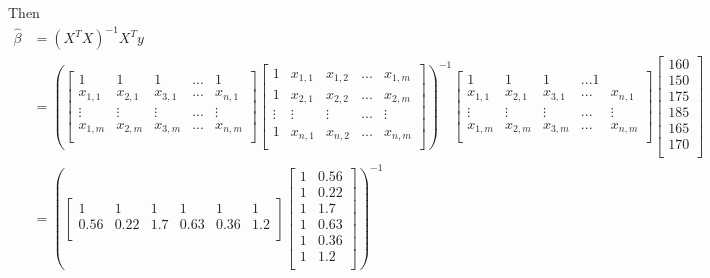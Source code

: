 \begin{enumerate}
Then \begin{align*}
\hat{\beta} &= (X^TX)^{-1}X^Ty \\ &= \left(
\begin{bmatrix}
1 & 1 & 1 & ... & 1  \\
x_{1,1} & x_{2,1} & x_{3,1} & ... & x_{n,1} \\
\vdots & \vdots & \vdots & ... & \vdots \\
x_{1,m} & x_{2,m} & x_{3,m} & ... & x_{n,m} \\
\end{bmatrix}
\begin{bmatrix}
1 & x_{1,1} & x_{1,2} & ... & x_{1,m} \\
1 & x_{2,1} & x_{2,2} & ... & x_{2,m} \\
\vdots & \vdots & \vdots & ... & \vdots \\
1 & x_{n,1} & x_{n,2} & ... & x_{n,m} \\
\end{bmatrix} \right)^{-1}\begin{bmatrix}
1 & 1 & 1 & ... 1  \\
x_{1,1} & x_{2,1} & x_{3,1} & ... & x_{n,1} \\
\vdots & \vdots & \vdots & ... & \vdots \\
x_{1,m} & x_{2,m} & x_{3,m} & ... & x_{n,m} \\
\end{bmatrix}
\begin{bmatrix}
160  \\
150  \\
175  \\
185  \\
165  \\
170  \\
\end{bmatrix} \\ &= \left(
\begin{bmatrix}
1 & 1 & 1 & 1 & 1 & 1 \\
0.56 & 0.22 & 1.7 & 0.63 & 0.36 &  1.2   \\
\end{bmatrix}
\begin{bmatrix}
1 & 0.56  \\
1 & 0.22  \\
1 & 1.7  \\
1 & 0.63  \\
1 & 0.36  \\
1 & 1.2  \\
\end{bmatrix} \right)^{-1}

\end{align*}
\end{enumerate}
